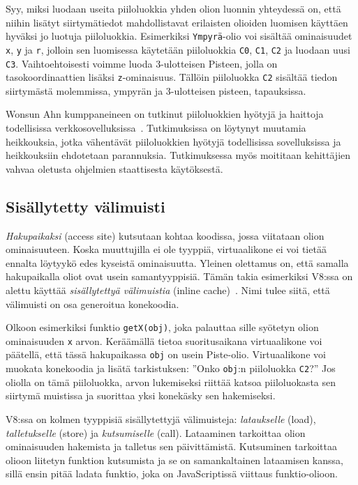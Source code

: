 Syy, miksi luodaan useita piiloluokkia yhden olion luonnin yhteydessä on, että niihin lisätyt siirtymätiedot mahdollistavat erilaisten olioiden luomisen käyttäen hyväksi jo luotuja piiloluokkia. Esimerkiksi \texttt{Ympyrä}-olio voi sisältää ominaisuudet \texttt{x}, \texttt{y} ja \texttt{r}, jolloin sen luomisessa käytetään piiloluokkia \texttt{C0}, \texttt{C1}, \texttt{C2} ja luodaan uusi \texttt{C3}. Vaihtoehtoisesti voimme luoda 3-ulotteisen Pisteen, jolla on tasokoordinaattien lisäksi \texttt{z}-ominaisuus. Tällöin piiloluokka \texttt{C2} sisältää tiedon siirtymästä molemmissa, ympyrän ja 3-ulotteisen pisteen, tapauksissa.

Wonsun Ahn kumppaneineen on tutkinut piiloluokkien hyötyjä ja haittoja todellisissa verkkosovelluksissa~\cite{Ahn2014}. Tutkimuksissa on löytynyt muutamia heikkouksia, jotka vähentävät piiloluokkien hyötyjä todellisissa sovelluksissa ja heikkouksiin ehdotetaan parannuksia. Tutkimuksessa myös moititaan kehittäjien vahvaa oletusta ohjelmien staattisesta käytöksestä.

\subsection{Sisällytetty välimuisti}

\textit{Hakupaikaksi} (access site) kutsutaan kohtaa koodissa, jossa viitataan olion ominaisuuteen. Koska muuttujilla ei ole tyyppiä, virtuaalikone ei voi tietää ennalta löytyykö edes kyseistä ominaisuutta. Yleinen olettamus on, että samalla hakupaikalla oliot ovat usein samantyyppisiä. Tämän takia esimerkiksi V8:ssa on alettu käyttää \textit{sisällytettyä välimuistia} (inline cache)~\cite[s.~498]{Ahn2014}. Nimi tulee siitä, että välimuisti on osa generoitua konekoodia.

Olkoon esimerkiksi funktio \texttt{getX(obj)}, joka palauttaa sille syötetyn olion ominaisuuden \texttt{x} arvon. Keräämällä tietoa suoritusaikana virtuaalikone voi päätellä, että tässä hakupaikassa \texttt{obj} on usein Piste-olio. Virtuaalikone voi muokata konekoodia ja lisätä tarkistuksen: ''Onko \texttt{obj}:n piiloluokka \texttt{C2}?'' Jos oliolla on tämä piiloluokka, arvon lukemiseksi riittää katsoa piiloluokasta sen siirtymä muistissa ja suorittaa yksi konekäsky sen hakemiseksi.

V8:ssa on kolmen tyyppisiä sisällytettyjä välimuisteja: \textit{lataukselle} (load), \textit{talletukselle} (store) ja \textit{kutsumiselle} (call). Lataaminen tarkoittaa olion ominaisuuden hakemista ja talletus sen päivittämistä. Kutsuminen tarkoittaa olioon liitetyn funktion kutsumista ja se on samankaltainen lataamisen kanssa, sillä ensin pitää ladata funktio, joka on JavaScriptissä viittaus funktio-olioon.


